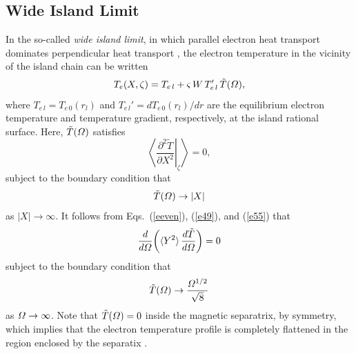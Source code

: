 \documentclass{iopjournal}
\begin{document}
\subsection{Wide Island Limit}
In the so-called {\em wide island limit}, in which parallel electron heat transport dominates perpendicular heat transport \cite{ntm2,island},
the electron temperature in the vicinity of the island chain can be written
\begin{equation}
T_e(X,\zeta) = T_{e\,l} + \varsigma\,W\,T_{e\,l}'\,\tilde{T}({\mit\Omega}),
\end{equation}
where $T_{e\,l}= T_{e\,0}(r_l)$ and $T_{e\,l}' = dT_{e\,0}(r_l)/dr$ are the equilibrium electron temperature and  temperature
gradient, respectively, at the island rational surface. 
Here, 
$\tilde{T}({\mit\Omega})$ satisfies \cite{ntm2}
\begin{equation}\label{e30}
\left\langle \left.\frac{\partial ^2\tilde{T}}{\partial X^2}\right|_\zeta \right\rangle =0,
\end{equation}
subject to the boundary condition that
\begin{equation}
\tilde{T}({\mit\Omega})\rightarrow |X|
\end{equation}
as $|X|\rightarrow \infty$. It
follows  from Eqs.~(\ref{eeven}), (\ref{e49}), and (\ref{e55})  that
\begin{equation}\label{e34}
\frac{d}{d{\mit\Omega}}\!\left(\langle Y^2\rangle\,\frac{d\tilde{T}}{d{\mit\Omega}}\right)=0
\end{equation}
subject to the boundary condition that
\begin{equation}
\tilde{T}({\mit\Omega})\rightarrow \frac{{\mit\Omega}^{1/2}}{\sqrt{8}}
\end{equation}
as ${\mit\Omega}\rightarrow\infty$. Note that $\tilde{T}({\mit\Omega})=0$ inside the magnetic separatrix, by symmetry, which implies that the electron
temperature profile is completely flattened in the region enclosed  by the separatix \cite{ntm2}.
\end{document}
